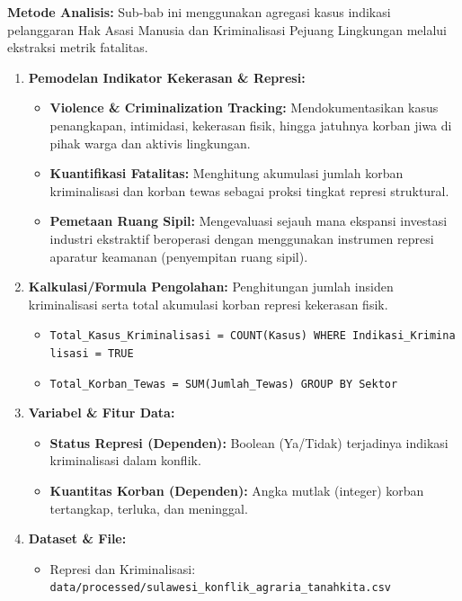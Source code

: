 \documentclass[
]{article}
\providecommand{\tightlist}{%
  \setlength{\itemsep}{0pt}\setlength{\parskip}{0pt}}
\begin{document}
\textbf{Metode Analisis:} Sub-bab ini menggunakan agregasi kasus
indikasi pelanggaran Hak Asasi Manusia dan Kriminalisasi Pejuang
Lingkungan melalui ekstraksi metrik fatalitas.

\begin{enumerate}
\def\labelenumi{\arabic{enumi}.}
\tightlist
\item
  \textbf{Pemodelan Indikator Kekerasan \& Represi:}

  \begin{itemize}
  \tightlist
  \item
    \textbf{Violence \& Criminalization Tracking:} Mendokumentasikan
    kasus penangkapan, intimidasi, kekerasan fisik, hingga jatuhnya
    korban jiwa di pihak warga dan aktivis lingkungan.
  \item
    \textbf{Kuantifikasi Fatalitas:} Menghitung akumulasi jumlah korban
    kriminalisasi dan korban tewas sebagai proksi tingkat represi
    struktural.
  \item
    \textbf{Pemetaan Ruang Sipil:} Mengevaluasi sejauh mana ekspansi
    investasi industri ekstraktif beroperasi dengan menggunakan
    instrumen represi aparatur keamanan (penyempitan ruang sipil).
  \end{itemize}
\item
  \textbf{Kalkulasi/Formula Pengolahan:} Penghitungan jumlah insiden
  kriminalisasi serta total akumulasi korban represi kekerasan fisik.

  \begin{itemize}
  \tightlist
  \item
    \texttt{Total\_Kasus\_Kriminalisasi\ =\ COUNT(Kasus)\ WHERE\ Indikasi\_Kriminalisasi\ =\ TRUE}
  \item
    \texttt{Total\_Korban\_Tewas\ =\ SUM(Jumlah\_Tewas)\ GROUP\ BY\ Sektor}
  \end{itemize}
\item
  \textbf{Variabel \& Fitur Data:}

  \begin{itemize}
  \tightlist
  \item
    \textbf{Status Represi (Dependen):} Boolean (Ya/Tidak) terjadinya
    indikasi kriminalisasi dalam konflik.
  \item
    \textbf{Kuantitas Korban (Dependen):} Angka mutlak (integer) korban
    tertangkap, terluka, dan meninggal.
  \end{itemize}
\item
  \textbf{Dataset \& File:}

  \begin{itemize}
  \tightlist
  \item
    Represi dan Kriminalisasi:
    \texttt{data/processed/sulawesi\_konflik\_agraria\_tanahkita.csv}
  \end{itemize}
\end{enumerate}
\end{document}
